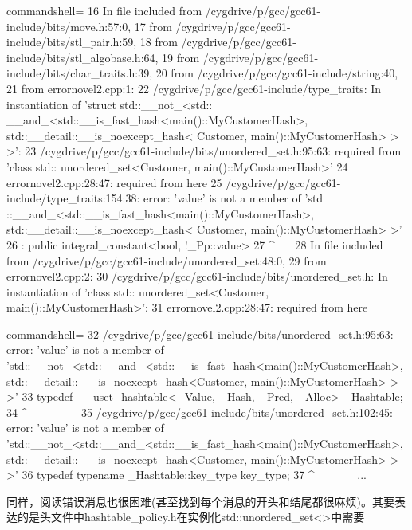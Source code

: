 {\scriptsize
\begin{tcblisting}{commandshell={}}
16 In file included from /cygdrive/p/gcc/gcc61-include/bits/move.h:57:0,
17                  from /cygdrive/p/gcc/gcc61-include/bits/stl_pair.h:59,
18                  from /cygdrive/p/gcc/gcc61-include/bits/stl_algobase.h:64,
19 from /cygdrive/p/gcc/gcc61-include/bits/char_traits.h:39,
20                  from /cygdrive/p/gcc/gcc61-include/string:40,
21                  from errornovel2.cpp:1:
22 /cygdrive/p/gcc/gcc61-include/type_traits: In instantiation of ’struct std::__not_<std::
   __and_<std::__is_fast_hash<main()::MyCustomerHash>, std::__detail::__is_noexcept_hash<
   Customer, main()::MyCustomerHash> > >’:
23 /cygdrive/p/gcc/gcc61-include/bits/unordered_set.h:95:63: required from ’class std::
   unordered_set<Customer, main()::MyCustomerHash>’
24 errornovel2.cpp:28:47: required from here
25 /cygdrive/p/gcc/gcc61-include/type_traits:154:38: error: ’value’ is not a member of ’std
   ::__and_<std::__is_fast_hash<main()::MyCustomerHash>, std::__detail::__is_noexcept_hash<
   Customer, main()::MyCustomerHash> >’
26      : public integral_constant<bool, !_Pp::value>
27                                                  ^~~~
28 In file included from /cygdrive/p/gcc/gcc61-include/unordered_set:48:0,
29                  from errornovel2.cpp:2:
30 /cygdrive/p/gcc/gcc61-include/bits/unordered_set.h: In instantiation of ’class std::
   unordered_set<Customer, main()::MyCustomerHash>’:
31 errornovel2.cpp:28:47: required from here
\end{tcblisting}
}
{\scriptsize
\begin{tcblisting}{commandshell={}}
32 /cygdrive/p/gcc/gcc61-include/bits/unordered_set.h:95:63: error: ’value’ is not a member
   of ’std::__not_<std::__and_<std::__is_fast_hash<main()::MyCustomerHash>, std::__detail::
   __is_noexcept_hash<Customer, main()::MyCustomerHash> > >’
33        typedef __uset_hashtable<_Value, _Hash, _Pred, _Alloc> _Hashtable;
34                                                                                  ^~~~~~~~~~
35 /cygdrive/p/gcc/gcc61-include/bits/unordered_set.h:102:45: error: ’value’ is not a member
   of ’std::__not_<std::__and_<std::__is_fast_hash<main()::MyCustomerHash>, std::__detail::
   __is_noexcept_hash<Customer, main()::MyCustomerHash> > >’
36 typedef typename _Hashtable::key_type key_type;
37                                                     ^~~~~~~~
...
\end{tcblisting}
}

同样，阅读错误消息也很困难(甚至找到每个消息的开头和结尾都很麻烦)。其要表达的是头文件中hashtable\_policy.h在实例化std::unordered\_set<>中需要

